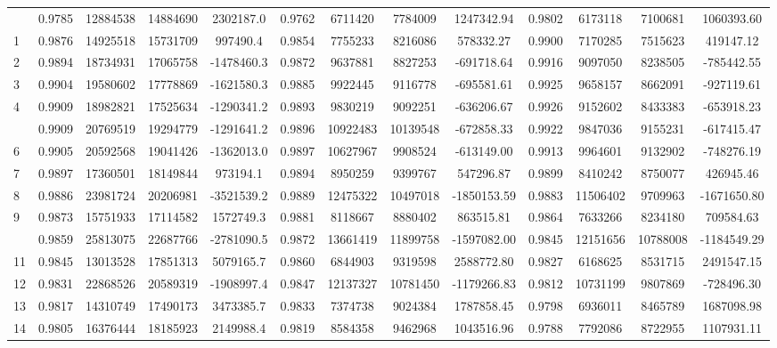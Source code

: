 \documentclass[
  12pt,
]{article}
\begin{document}
\begin{longtable}[t]{lcccccccccccc}
\endfoot
\bottomrule
\endlastfoot
0 & 0.9785 & 12884538 & 14884690 & 2302187.0 & 0.9762 & 6711420 & 7784009 & 1247342.94 & 0.9802 & 6173118 & 7100681 & 1060393.60\\
1 & 0.9876 & 14925518 & 15731709 & 997490.4 & 0.9854 & 7755233 & 8216086 & 578332.27 & 0.9900 & 7170285 & 7515623 & 419147.12\\
2 & 0.9894 & 18734931 & 17065758 & -1478460.3 & 0.9872 & 9637881 & 8827253 & -691718.64 & 0.9916 & 9097050 & 8238505 & -785442.55\\
3 & 0.9904 & 19580602 & 17778869 & -1621580.3 & 0.9885 & 9922445 & 9116778 & -695581.61 & 0.9925 & 9658157 & 8662091 & -927119.61\\
4 & 0.9909 & 18982821 & 17525634 & -1290341.2 & 0.9893 & 9830219 & 9092251 & -636206.67 & 0.9926 & 9152602 & 8433383 & -653918.23\\
\addlinespace
5 & 0.9909 & 20769519 & 19294779 & -1291641.2 & 0.9896 & 10922483 & 10139548 & -672858.33 & 0.9922 & 9847036 & 9155231 & -617415.47\\
6 & 0.9905 & 20592568 & 19041426 & -1362013.0 & 0.9897 & 10627967 & 9908524 & -613149.00 & 0.9913 & 9964601 & 9132902 & -748276.19\\
7 & 0.9897 & 17360501 & 18149844 & 973194.1 & 0.9894 & 8950259 & 9399767 & 547296.87 & 0.9899 & 8410242 & 8750077 & 426945.46\\
8 & 0.9886 & 23981724 & 20206981 & -3521539.2 & 0.9889 & 12475322 & 10497018 & -1850153.59 & 0.9883 & 11506402 & 9709963 & -1671650.80\\
9 & 0.9873 & 15751933 & 17114582 & 1572749.3 & 0.9881 & 8118667 & 8880402 & 863515.81 & 0.9864 & 7633266 & 8234180 & 709584.63\\
\addlinespace
10 & 0.9859 & 25813075 & 22687766 & -2781090.5 & 0.9872 & 13661419 & 11899758 & -1597082.00 & 0.9845 & 12151656 & 10788008 & -1184549.29\\
11 & 0.9845 & 13013528 & 17851313 & 5079165.7 & 0.9860 & 6844903 & 9319598 & 2588772.80 & 0.9827 & 6168625 & 8531715 & 2491547.15\\
12 & 0.9831 & 22868526 & 20589319 & -1908997.4 & 0.9847 & 12137327 & 10781450 & -1179266.83 & 0.9812 & 10731199 & 9807869 & -728496.30\\
13 & 0.9817 & 14310749 & 17490173 & 3473385.7 & 0.9833 & 7374738 & 9024384 & 1787858.45 & 0.9798 & 6936011 & 8465789 & 1687098.98\\
14 & 0.9805 & 16376444 & 18185923 & 2149988.4 & 0.9819 & 8584358 & 9462968 & 1043516.96 & 0.9788 & 7792086 & 8722955 & 1107931.11\\

\end{longtable}
\end{document}
